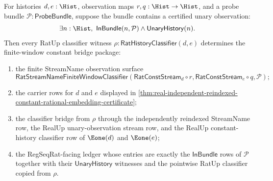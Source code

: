 \begin{theorem}
\label{thm:real-reindexed-constant-finite-window-package}
For histories $d,e:\Hist$, observation maps $r,q:\Hist\to\Hist$, and a probe
bundle $\mathcal{P}:\mathsf{ProbeBundle}$, suppose the bundle contains a
certified unary observation:
$$
\exists n:\Hist,\ \mathsf{InBundle}(n,\mathcal{P})\land
\mathsf{UnaryHistory}(n).
$$
Then every RatUp classifier witness
$\rho:\mathsf{RatHistoryClassifier}(d,e)$ determines the finite-window
constant bridge package:
\begin{enumerate}
  \item the finite StreamName observation surface
  $$
  \mathsf{RatStreamNameFiniteWindowClassifier}
  (\mathsf{RatConstStream}_d\circ r,
   \mathsf{RatConstStream}_e\circ q,\mathcal{P});
  $$
  \item the carrier rows for $d$ and $e$ displayed in
  \autoref{thm:real-independent-reindexed-constant-rational-embedding-certificate};
  \item the classifier bridge from $\rho$ through the independently reindexed
  StreamName row, the RealUp unary-observation stream row, and the RealUp
  constant-history classifier row of $\Eone(d)$ and $\Eone(e)$;
  \item the RegSeqRat-facing ledger whose entries are exactly the
  $\mathsf{InBundle}$ rows of $\mathcal{P}$ together with their
  $\mathsf{UnaryHistory}$ witnesses and the pointwise RatUp classifier copied
  from $\rho$.
\end{enumerate}
\end{theorem}
